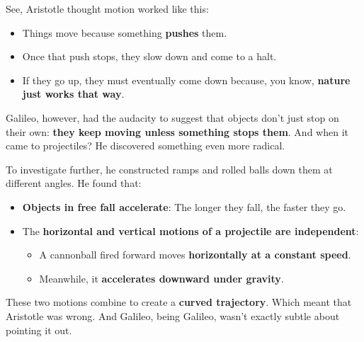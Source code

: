 See, Aristotle thought motion worked like this:
\begin{itemize}
    \item Things move because something \textbf{pushes} them.
    \item Once that push stops, they slow down and come to a halt.
    \item If they go up, they must eventually come down because, you know, \textbf{nature just works that way}.
\end{itemize}

Galileo, however, had the audacity to suggest that objects don’t just stop on their own: \textbf{they keep moving unless something stops them}. And when it came to projectiles? He discovered something even more radical.

To investigate further, he constructed ramps and rolled balls down them at different angles. He found that:

\begin{itemize}
    \item \textbf{Objects in free fall accelerate}: The longer they fall, the faster they go.
    \item The \textbf{horizontal and vertical motions of a projectile are independent}:
    \begin{itemize}
        \item A cannonball fired forward moves \textbf{horizontally at a constant speed}.
        \item Meanwhile, it \textbf{accelerates downward under gravity}.
    \end{itemize}
\end{itemize}

These two motions combine to create a \textbf{curved trajectory}. Which meant that Aristotle was wrong. And Galileo, being Galileo, wasn’t exactly subtle about pointing it out.

